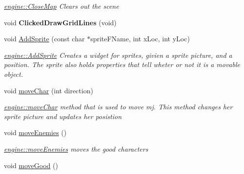 \begin{DoxyCompactItemize}
\begin{DoxyCompactList}\small\item\em \hyperlink{classengine_a68b46ec574d97c62f29206fd201b34b5}{engine\-::\-Close\-Map} Clears out the scene \end{DoxyCompactList}\item 
\hypertarget{classengine_aff95606d7fa78ddd3f13b0573d8fa284}{void {\bfseries Clicked\-Draw\-Grid\-Lines} (void)}\label{classengine_aff95606d7fa78ddd3f13b0573d8fa284}

\item 
\hypertarget{classengine_a804d510d34deaebcfff0bf5af93568ec}{void \hyperlink{classengine_a804d510d34deaebcfff0bf5af93568ec}{Add\-Sprite} (const char $\ast$sprite\-F\-Name, int x\-Loc, int y\-Loc)}\label{classengine_a804d510d34deaebcfff0bf5af93568ec}

\begin{DoxyCompactList}\small\item\em \hyperlink{classengine_a804d510d34deaebcfff0bf5af93568ec}{engine\-::\-Add\-Sprite} Creates a widget for sprites, givien a sprite picture, and a position. The sprite also holds properties that tell wheter or not it is a movable object. \end{DoxyCompactList}\item 
\hypertarget{classengine_ac084e69968320aa57383fc251f54b887}{void \hyperlink{classengine_ac084e69968320aa57383fc251f54b887}{move\-Char} (int direction)}\label{classengine_ac084e69968320aa57383fc251f54b887}

\begin{DoxyCompactList}\small\item\em \hyperlink{classengine_ac084e69968320aa57383fc251f54b887}{engine\-::move\-Char} method that is used to move mj. This method changes her sprite picture and updates her posistion \end{DoxyCompactList}\item 
\hypertarget{classengine_ab27f5792c30dfd6e6cc4fcfd390d15eb}{void \hyperlink{classengine_ab27f5792c30dfd6e6cc4fcfd390d15eb}{move\-Enemies} ()}\label{classengine_ab27f5792c30dfd6e6cc4fcfd390d15eb}

\begin{DoxyCompactList}\small\item\em \hyperlink{classengine_ab27f5792c30dfd6e6cc4fcfd390d15eb}{engine\-::move\-Enemies} moves the good characters \end{DoxyCompactList}\item 
\hypertarget{classengine_ad010e22061b9a72eb0ff69821ffbfbc6}{void \hyperlink{classengine_ad010e22061b9a72eb0ff69821ffbfbc6}{move\-Good} ()}\label{classengine_ad010e22061b9a72eb0ff69821ffbfbc6}


\end{DoxyCompactItemize}

